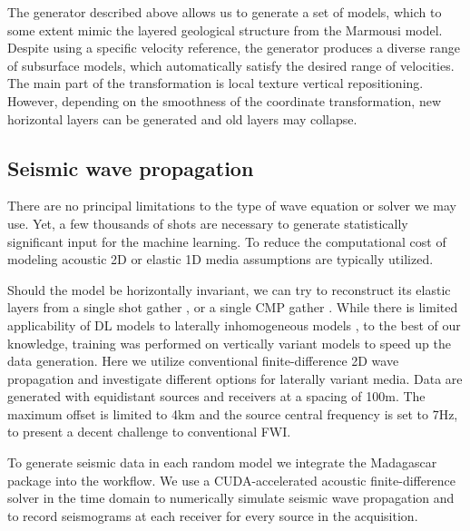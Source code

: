 \documentclass[manuscript]{geophysics}
\begin{document}


The generator described above allows us to generate a set of models, which to some extent mimic the layered geological structure from the Marmousi model. Despite using a specific velocity reference, the generator produces a diverse range of subsurface models, which automatically satisfy the desired range of velocities. The main part of the transformation is local texture vertical repositioning. However, depending on the smoothness of the coordinate transformation, new horizontal layers can be generated and old layers may collapse.

\subsection{Seismic wave propagation}
There are no principal limitations to the type of wave equation or solver we may use. Yet, a few thousands of shots are necessary to generate statistically significant input for the machine learning. To reduce the computational cost of modeling acoustic 2D \citep{polo2018,ovcharenko2018,ovcharenko2019deep, li2019} or elastic 1D \citep[e.g.][]{zheng2019} media assumptions are typically utilized.

Should the model be horizontally invariant, we can try to reconstruct its elastic layers from a single shot gather \citep{roth1994}, or a single CMP gather \citep{zheng2019}.
While there is limited applicability of DL models to laterally inhomogeneous models \citep{zheng2019}, to the best of our knowledge, training was performed on vertically variant models to speed up the data generation. Here we utilize conventional finite-difference 2D wave propagation and investigate different options for laterally variant media.
Data are generated with equidistant sources and receivers at a spacing of 100m. The maximum offset is limited to 4km and the source central frequency is set to 7Hz, to present a decent challenge to conventional FWI.

To generate seismic data in each random model we integrate the Madagascar package \citep{fomel2013madagascar} into the workflow. 
We use a CUDA-accelerated acoustic finite-difference solver in the time domain to numerically simulate seismic wave propagation and to record seismograms at each receiver for every source in the acquisition.
%
\end{document}
